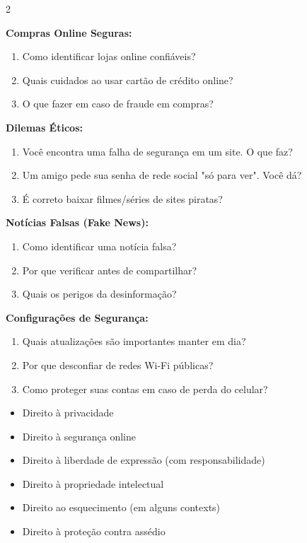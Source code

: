 \documentclass[11pt]{article}
\begin{document}
\begin{multicols}{2}

\item \textbf{Compras Online Seguras:}
\begin{enumerate}[label=\alph*)]
\item Como identificar lojas online confiáveis?
\item Quais cuidados ao usar cartão de crédito online?
\item O que fazer em caso de fraude em compras?
\end{enumerate}

\item \textbf{Dilemas Éticos:}
\begin{enumerate}[label=\alph*)]
\item Você encontra uma falha de segurança em um site. O que faz?
\item Um amigo pede sua senha de rede social "só para ver". Você dá?
\item É correto baixar filmes/séries de sites piratas?
\end{enumerate}

\item \textbf{Notícias Falsas (Fake News):}
\begin{enumerate}[label=\alph*)]
\item Como identificar uma notícia falsa?
\item Por que verificar antes de compartilhar?
\item Quais os perigos da desinformação?
\end{enumerate}

\item \textbf{Configurações de Segurança:}
\begin{enumerate}[label=\alph*)]
\item Quais atualizações são importantes manter em dia?
\item Por que desconfiar de redes Wi-Fi públicas?
\item Como proteger suas contas em caso de perda do celular?
\end{enumerate}


\begin{itemize}
\item Direito à privacidade
\item Direito à segurança online
\item Direito à liberdade de expressão (com responsabilidade)
\item Direito à propriedade intelectual
\item Direito ao esquecimento (em alguns contexts)
\item Direito à proteção contra assédio
\end{itemize}

\end{multicols}
\end{document}
